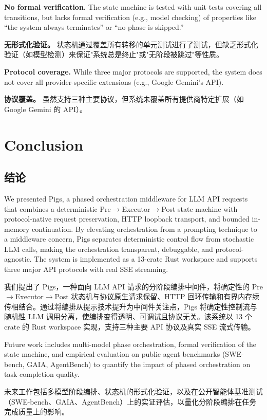 \textbf{No formal verification.} The state machine is tested with unit tests covering all transitions, but lacks formal verification (e.g., model checking) of properties like ``the system always terminates'' or ``no phase is skipped.''
\begin{chinese}
\textbf{无形式化验证。} 状态机通过覆盖所有转移的单元测试进行了测试，但缺乏形式化验证（如模型检测）来保证"系统总是终止"或"无阶段被跳过"等性质。
\end{chinese}

\textbf{Protocol coverage.} While three major protocols are supported, the system does not cover all provider-specific extensions (e.g., Google Gemini's API).
\begin{chinese}
\textbf{协议覆盖。} 虽然支持三种主要协议，但系统未覆盖所有提供商特定扩展（如 Google Gemini 的 API）。
\end{chinese}

\section{Conclusion}
\label{sec:conclusion}
\begin{chinese}
\section{结论}
\end{chinese}

We presented Pigs, a phased orchestration middleware for LLM API requests that combines a deterministic Pre$\rightarrow$Executor$\rightarrow$Post state machine with protocol-native request preservation, HTTP loopback transport, and bounded in-memory continuation. By elevating orchestration from a prompting technique to a middleware concern, Pigs separates deterministic control flow from stochastic LLM calls, making the orchestration transparent, debuggable, and protocol-agnostic. The system is implemented as a 13-crate Rust workspace and supports three major API protocols with real SSE streaming.
\begin{chinese}
我们提出了 Pigs，一种面向 LLM API 请求的分阶段编排中间件，将确定性的 Pre$\rightarrow$Executor$\rightarrow$Post 状态机与协议原生请求保留、HTTP 回环传输和有界内存续传相结合。通过将编排从提示技术提升为中间件关注点，Pigs 将确定性控制流与随机性 LLM 调用分离，使编排变得透明、可调试且协议无关。该系统以 13 个 crate 的 Rust workspace 实现，支持三种主要 API 协议及真实 SSE 流式传输。
\end{chinese}

Future work includes multi-model phase orchestration, formal verification of the state machine, and empirical evaluation on public agent benchmarks (SWE-bench, GAIA, AgentBench) to quantify the impact of phased orchestration on task completion quality.
\begin{chinese}
未来工作包括多模型阶段编排、状态机的形式化验证，以及在公开智能体基准测试（SWE-bench、GAIA、AgentBench）上的实证评估，以量化分阶段编排在任务完成质量上的影响。
\end{chinese}
